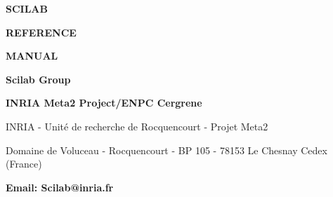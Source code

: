 \pagestyle{empty}
\begin{center}
\end{center} 

\newpage

\vspace{8.cm}

{\Huge\bf SCILAB}

\bigskip

{\Huge\bf REFERENCE}

\bigskip

{\Huge\bf MANUAL}

\vspace{3.cm}

{\Huge\bf Scilab Group}

{\Large\bf
INRIA Meta2 Project/ENPC Cergrene}

\normalsize

\vspace{12.cm}

INRIA - Unit\'e de recherche de Rocquencourt - Projet Meta2

Domaine de Voluceau - Rocquencourt - BP 105 - 78153 Le Chesnay Cedex (France)

{\bf Email: Scilab@inria.fr}

